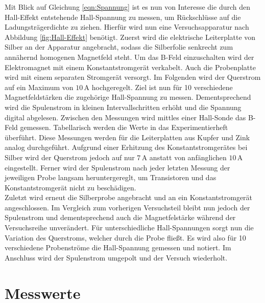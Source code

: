 \noindent Mit Blick auf Gleichung \eqref{eqn:Spannung} ist es nun von Interesse die durch den Hall-Effekt entstehende 
Hall-Spannung zu messen, um Rückschlüsse auf die Ladungsträgerdichte zu ziehen. Hierfür wird nun eine Versuchsapparatur 
nach Abbildung \ref{fig:Hall-Effekt} benötigt. Zuerst wird die elektrische Leiterplatte von Silber an der Apparatur 
angebracht, sodass die Silberfolie senkrecht zum annähernd homogenen Magnetfeld steht. Um das B-Feld einzuschalten wird 
der Elektromagnet mit einem Konstantstromgerät verkabelt. Auch die Probenplatte wird mit einem separaten Stromgerät versorgt.
Im Folgenden wird der Querstrom auf ein Maximum von $10\,\unit{\ampere}$ hochgeregelt. Ziel ist nun für 10 verschiedene 
Magnetfeldstärken die zugehörige Hall-Spannung zu messen. Dementsprechend wird die Spulenstrom in kleinen Intervallschritten 
erhöht und die Spannung digital abgelesen. Zwischen den Messungen wird mittles einer Hall-Sonde das B-Feld gemessen. Tabellarisch 
werden die Werte in das Experimentierheft überführt. Diese Messungen werden für die Leiterplatten aus Kupfer und Zink analog 
durchgeführt. Aufgrund einer Erhitzung des Konstantstromgerätes bei Silber wird der Querstrom jedoch auf nur $7\,\unit{\ampere}$
anstatt von anfänglichen $10\,\unit{\ampere}$ eingestellt. Ferner wird der Spulenstrom nach jeder letzten Messung der jeweiligen 
Probe langsam heruntergereglt, um Transistoren und das Konstantstromgerät nicht zu beschädigen.\\

\noindent Zuletzt wird erneut die Silberprobe angebracht und an ein Konstantstromgerät angeschlossen. Im Vergleich zum vorherigen 
Versuchsteil bleibt nun jedoch der Spulenstrom und dementsprechend auch die Magnetfelstärke während der Versuchsreihe unverändert.
Für unterschiedliche Hall-Spannungen sorgt nun die Variation des Querstroms, welcher durch die Probe fließt. Es wird also für 10 
verschiedene Probenströme die Hall-Spannung gemessen und notiert. Im Anschluss wird der Spulenstrom umgepolt und der Versuch wiederholt.\\

\noindent 

\section{Messwerte}
\label{sec:Messwerte}




